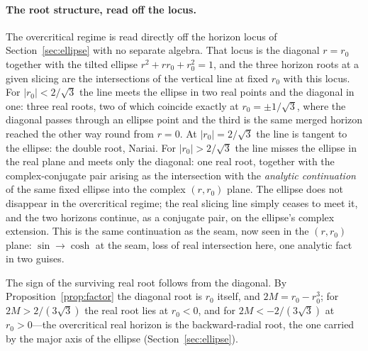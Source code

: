 \documentclass[11pt,a4paper]{article}
\theoremstyle{definition}
\begin{document}
\paragraph{The root structure, read off the locus.} The overcritical regime is read directly off the horizon locus of Section~\ref{sec:ellipse} with no separate algebra. That locus is the diagonal $r=r_{0}$ together with the tilted ellipse $r^{2}+r r_{0}+r_{0}^{2}=1$, and the three horizon roots at a given slicing are the intersections of the vertical line at fixed $r_{0}$ with this locus. For $|r_{0}|<2/\sqrt{3}$ the line meets the ellipse in two real points and the diagonal in one: three real roots, two of which coincide exactly at $r_{0}=\pm1/\sqrt3$, where the diagonal passes through an ellipse point and the third is the same merged horizon reached the other way round from $r=0$. At $|r_{0}|=2/\sqrt{3}$ the line is tangent to the ellipse: the double root, Nariai. For $|r_{0}|>2/\sqrt{3}$ the line misses the ellipse in the real plane and meets only the diagonal: one real root, together with the complex-conjugate pair arising as the intersection with the \emph{analytic continuation} of the same fixed ellipse into the complex $(r,r_{0})$ plane. The ellipse does not disappear in the overcritical regime; the real slicing line simply ceases to meet it, and the two horizons continue, as a conjugate pair, on the ellipse's complex extension. This is the same continuation as the seam, now seen in the $(r,r_{0})$ plane: $\sin\to\cosh$ at the seam, loss of real intersection here, one analytic fact in two guises.

The sign of the surviving real root follows from the diagonal. By Proposition~\ref{prop:factor} the diagonal root is $r_{0}$ itself, and $2M=r_{0}-r_{0}^{3}$; for $2M>2/(3\sqrt3)$ the real root lies at $r_{0}<0$, and for $2M<-2/(3\sqrt3)$ at $r_{0}>0$---the overcritical real horizon is the backward-radial root, the one carried by the major axis of the ellipse (Section~\ref{sec:ellipse}).
\end{document}
